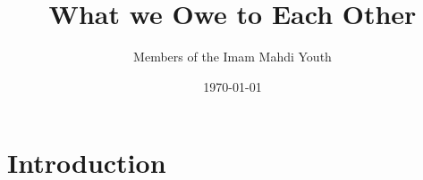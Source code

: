 \documentclass{article}
\begin{document}
\linenumbers



\title{What we Owe to Each Other}
\author{Members of the Imam Mahdi Youth}
\date{\today}
\maketitle

\section{Introduction}



\end{document}
